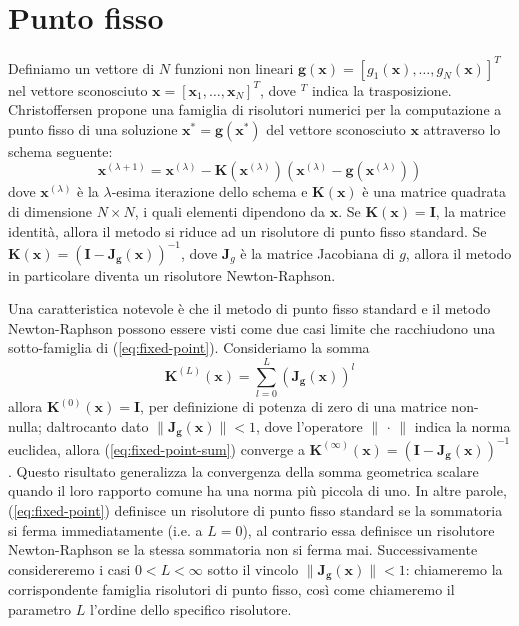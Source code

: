 \chapter{Punto fisso}
	Definiamo un vettore di $N$ funzioni non lineari $\mathbf{g(x)} = [g_{1}(\mathbf{x}), \dots , g_{N}(\mathbf{x})]^{T}$ nel vettore sconosciuto $\mathbf{x} = [\mathbf{x}_{1}, \dots , \mathbf{x}_{N}]^{T}$, dove $^T$ indica la trasposizione. Christoffersen propone una famiglia di risolutori numerici per la computazione a punto fisso di una soluzione $\mathbf{x}^{*} = \mathbf{g(x^{*})}$ del vettore sconosciuto $\mathbf{x}$ attraverso lo schema seguente:
	\begin{equation}
		\label{eq:fixed-point}
		\mathbf{x}^{(\lambda+1)} = \mathbf{x}^{(\lambda)}-\mathbf{K}(\mathbf{x}^{(\lambda)})(\mathbf{x}^{(\lambda)}-\mathbf{g}(\mathbf{x}^{(\lambda)}))
	\end{equation}
	dove $\mathbf{x}^{(\lambda)}$ è la $\lambda$-esima iterazione dello schema e $\mathbf{K(x)}$ è una matrice quadrata di dimensione $N \times N$, i quali elementi dipendono da $\mathbf{x}$. Se $\mathbf{K}(\mathbf{x}) = \mathbf{I}$, la matrice identità, allora il metodo si riduce ad un risolutore di punto fisso standard. Se $\mathbf{K}(\mathbf{x}) = (\mathbf{I}-\mathbf{J_{g}(x)})^{-1}$, dove $\mathbf{J}_{g}$ è la matrice Jacobiana di $g$, allora il metodo in particolare diventa un risolutore Newton-Raphson.
		
	Una caratteristica notevole è che il metodo di punto fisso standard e il metodo Newton-Raphson possono essere visti come due casi limite che racchiudono una sotto-famiglia di (\ref{eq:fixed-point}). Consideriamo la somma
	\begin{equation}
		\label{eq:fixed-point-sum}
		\mathbf{K}^{(L)}(\mathbf{x}) = \sum_{l=0}^{L} \left(\mathbf{J_{g}(x)}\right)^{l}
	\end{equation}
	allora $\mathbf{K}^{(0)}(\mathbf{x}) = \mathbf{I}$, per definizione di potenza di zero di una matrice non-nulla; daltrocanto dato $\lVert\mathbf{J_{g}(x)}\rVert < 1$, dove l'operatore $\lVert\,\cdot\,\rVert$ indica la norma euclidea, allora (\ref{eq:fixed-point-sum}) converge a $\mathbf{K}^{(\infty)}(\mathbf{x}) = (\mathbf{I}-\mathbf{J_{g}(x)})^{-1}$.
	Questo risultato generalizza la convergenza della somma geometrica scalare quando il loro rapporto comune ha una norma più piccola di uno. In altre parole, (\ref{eq:fixed-point}) definisce un risolutore di punto fisso standard se la sommatoria si ferma immediatamente (i.e. a $L = 0$), al contrario essa definisce un risolutore Newton-Raphson se la stessa sommatoria non si ferma mai. Successivamente considereremo i casi $0 < L < \infty$ sotto il vincolo $\lVert\mathbf{J_{g}(x)}\rVert < 1$: chiameremo la corrispondente famiglia risolutori di punto fisso, così come chiameremo il parametro $L$ l'ordine dello specifico risolutore.